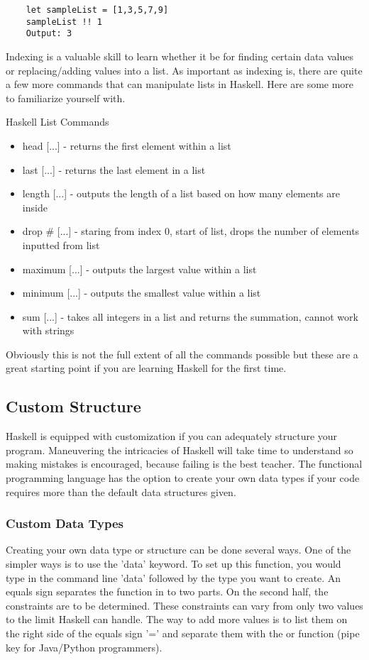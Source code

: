 \documentclass{article}
\begin{document}
    \begin{lstlisting}
    let sampleList = [1,3,5,7,9]
    sampleList !! 1
    Output: 3
    \end{lstlisting}
    
    Indexing is a valuable skill to learn whether it be for finding certain data values or replacing/adding values into a list. As important as indexing is, there are quite a few more commands that can manipulate lists in Haskell. Here are some more to familiarize yourself with.
    
    \medskip\medskip
    \caption{Haskell List Commands}
    \begin{itemize}
              \item head [...] - returns the first element within a list
              \item last [...] - returns the last element in a list
              \item length [...] - outputs the length of a list based on how many elements are inside
              \item drop # [...] - staring from index 0, start of list, drops the number of elements inputted from list
              \item maximum [...] - outputs the largest value within a list
              \item minimum [...] - outputs the smallest value within a list
              \item sum [...] - takes all integers in a list and returns the summation, cannot work with strings
    \end{itemize}
    
    \medskip
    \noindent Obviously this is not the full extent of all the commands possible but these are a great starting point if you are learning Haskell for the first time. 

\subsection{Custom Structure}
Haskell is equipped with customization if you can adequately structure your program. Maneuvering the intricacies of Haskell will take time to understand so making mistakes is encouraged, because failing is the best teacher. The functional programming language has the option to create your own data types if your code requires more than the default data structures given. 

    \subsubsection{Custom Data Types}
    Creating your own data type or structure can be done several ways. One of the simpler ways is to use the 'data' keyword. To set up this function, you would type in the command line 'data' followed by the type you want to create. An equals sign separates the function in to two parts. On the second half, the constraints are to be determined. These constraints can vary from only two values to the limit Haskell can handle. The way to add more values is to list them on the right side of the equals sign '=' and separate them with the or function (pipe key for Java/Python programmers).
    
\end{document}
